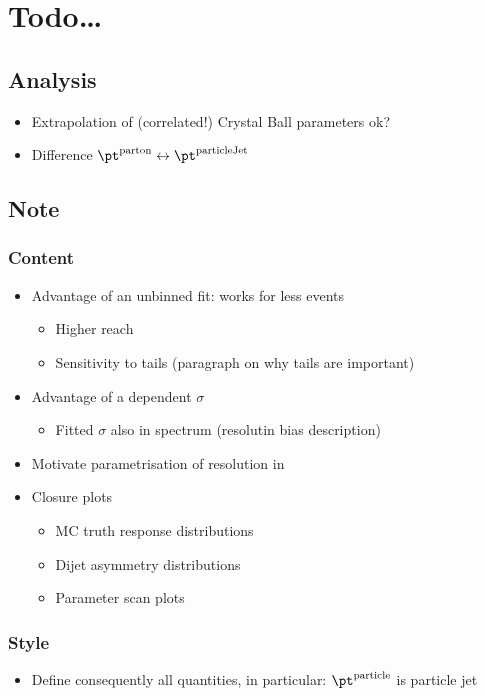 

\section{Todo\ldots}

\subsection{Analysis}
\begin{itemize}
\item Extrapolation of (correlated!) Crystal Ball parameters ok?
\item Difference $\pt^{\text{parton}} \leftrightarrow \pt^{\text{particleJet}}$
\end{itemize}


\subsection{Note}

\subsubsection{Content}
\begin{itemize}
\item Advantage of an unbinned fit: works for less events
  \begin{itemize}
  \item Higher \pt reach
  \item Sensitivity to tails (paragraph on why tails are important)
  \end{itemize}
\item Advantage of a \pt dependent $\sigma$
  \begin{itemize}
  \item Fitted $\sigma$ also in spectrum (resolutin bias description)
  \end{itemize}
\item Motivate parametrisation of resolution in \pt
\item Closure plots
  \begin{itemize}
  \item MC truth response distributions
  \item Dijet asymmetry distributions
  \item Parameter scan plots
  \end{itemize}
\end{itemize}

\subsubsection{Style}
\begin{itemize}
\item Define consequently all quantities, in particular: $\pt^{\text{particle}}$ is particle jet \pt
\end{itemize}
